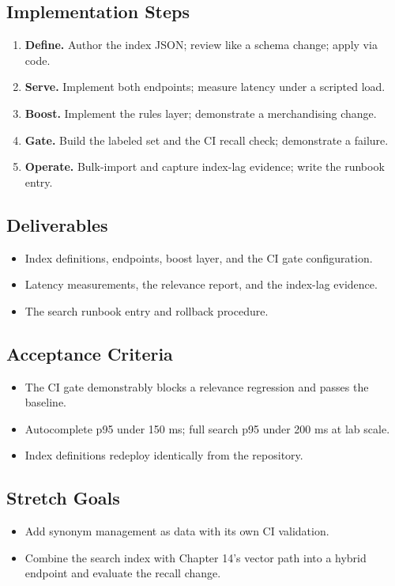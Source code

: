 \subsection*{Implementation Steps}
\begin{enumerate}
    \item \textbf{Define.} Author the index JSON; review like a schema change; apply via code.
    \item \textbf{Serve.} Implement both endpoints; measure latency under a scripted load.
    \item \textbf{Boost.} Implement the rules layer; demonstrate a merchandising change.
    \item \textbf{Gate.} Build the labeled set and the CI recall check; demonstrate a failure.
    \item \textbf{Operate.} Bulk-import and capture index-lag evidence; write the runbook entry.
\end{enumerate}

\subsection*{Deliverables}
\begin{itemize}
    \item Index definitions, endpoints, boost layer, and the CI gate configuration.
    \item Latency measurements, the relevance report, and the index-lag evidence.
    \item The search runbook entry and rollback procedure.
\end{itemize}

\subsection*{Acceptance Criteria}
\begin{itemize}
    \item The CI gate demonstrably blocks a relevance regression and passes the baseline.
    \item Autocomplete p95 under 150 ms; full search p95 under 200 ms at lab scale.
    \item Index definitions redeploy identically from the repository.
\end{itemize}

\subsection*{Stretch Goals}
\begin{itemize}
    \item Add synonym management as data with its own CI validation.
    \item Combine the search index with Chapter 14's vector path into a hybrid endpoint and evaluate the recall change.
\end{itemize}
